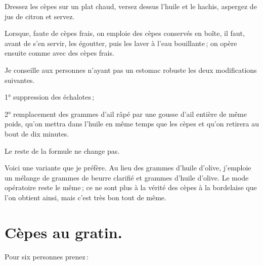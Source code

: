 Dressez les cèpes sur un plat chaud, versez dessus l'huile et le hachis, aspergez
de jus de citron et servez.

\medskip

Lorsque, faute de cèpes frais, on emploie des cèpes conservés en boîte, il
faut, avant de s'en servir, les égoutter, puis les laver à l'eau bouillante ;
on opère ensuite comme avec des cèpes frais.

\medskip

Je conseille aux personnes n'ayant pas un estomac robuste les deux
modifications suivantes.

1° suppression des échalotes ;

2° remplacement des {\mmm} grammes d'ail râpé par une gousse d'ail entière
de même poids, qu'on mettra dans l'huile en même temps que les cèpes et qu'on
retirera au bout de dix minutes.

Le reste de la formule ne change pas.

\sk

Voici une variante que je préfère. Au lieu des {\mmm} grammes d'huile
d'olive, j'emploie un mélange de {\mmm} grammes de beurre clarifié et
{\mmm} grammes d'huile d'olive. Le mode opératoire reste le même ; ce ne
sont plus à la vérité des cèpes à la bordelaise que l'on obtient ainsi, mais
c'est très bon tout de même.

\section*{\centering Cèpes au gratin.}
{}

Pour six personnes prenez :

